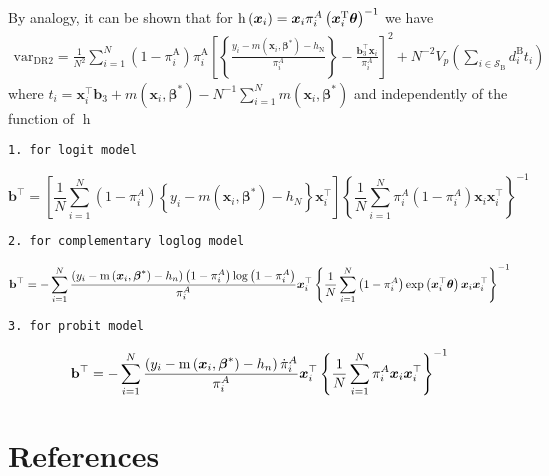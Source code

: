 \documentclass[
  letterpaper,
  DIV=11,
  numbers=noendperiod]{scrreprt}
\begin{document}
By analogy, it can be shown that for
\(\operatorname{h}\left(\boldsymbol{x}_i\right) = \boldsymbol{x}_i \pi_i^A\left(\boldsymbol{x}_i^{\mathrm{T}} \boldsymbol{\theta} \right)^{-1}\)
we have \[
\begin{gathered}
\text{var}_{\mathrm{DR} 2}=\frac{1}{N^2} \sum_{i=1}^N\left(1-\pi_i^{\mathrm{A}}\right) \pi_i^{\mathrm{A}}\left[\left\{\frac{y_i-m\left(\boldsymbol{x}_i, \boldsymbol{\beta}^*\right)-h_{\mathrm{N}}}{\pi_i^A}\right\} -
\frac{\mathbf{b}_3^{\top} \boldsymbol{x}_i}{\pi_i^A}\right]^2 + N^{-2} V_p\left(\sum_{i \in \mathcal{S}_{\mathrm{B}}} d_i^{\mathrm{B}} t_i\right)
\end{gathered}
\] where
\(t_i= \boldsymbol{x}_i^{\top} \mathbf{b}_3+m\left(\boldsymbol{x}_i, \boldsymbol{\beta}^*\right)-N^{-1} \sum_{i=1}^N m\left(\boldsymbol{x}_i, \boldsymbol{\beta}^*\right)\)
and independently of the function of \(\operatorname{h}\)

\begin{verbatim}
1. for logit model
\end{verbatim}

\[
\mathbf{b}^{\top}=\left[\frac{1}{N} \sum_{i=1}^N\left(1-\pi_i^A\right)\left\{y_i-m\left(\boldsymbol{x}_i, \boldsymbol{\beta}^*\right)-h_N\right\} \boldsymbol{x}_i^{\top}\right]\left\{\frac{1}{N} \sum_{i=1}^N \pi_i^A\left(1-\pi_i^A\right) \boldsymbol{x}_i \boldsymbol{x}_i^{\top}\right\}^{-1}
\]

\begin{verbatim}
2. for complementary loglog model
\end{verbatim}

\[\mathbf{b}^{\top} = -\sum_{i=1}^N \frac{\left(y_i - \operatorname{m}\left(\boldsymbol{x}_i,\boldsymbol{\beta}^*\right) - h_n\right)\left(1 - \pi_i^A\right) \log \left(1 - \pi_i^A\right)}{\pi_i^A}\boldsymbol{x}_i^{\top} \left\{\frac{1}{N}\sum_{i=1}^N \left(1 - \pi_i^A\right) \exp\left(\boldsymbol{x}_i^{\top}\boldsymbol{\theta}\right) \boldsymbol{x}_i \boldsymbol{x}_i^{\top}\right\} ^ {-1}\]

\begin{verbatim}
3. for probit model
\end{verbatim}

\[\mathbf{b}^{\top} = -\sum_{i=1}^N \frac{\left(y_i - \operatorname{m}\left(\boldsymbol{x}_i,\boldsymbol{\beta}^*\right) - h_n\right)\dot{\pi}_i^A}{\pi_i^A}\boldsymbol{x}_i^{\top} \left\{\frac{1}{N}\sum_{i=1}^N \pi_i^A \boldsymbol{x}_i \boldsymbol{x}_i^{\top}\right\} ^ {-1}\]


\hypertarget{references}{%
\chapter{References}\label{references}}
\end{document}
